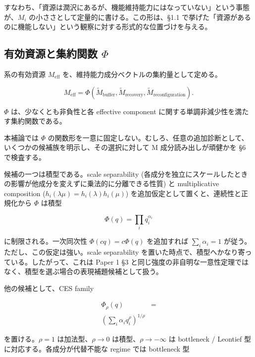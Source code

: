 \documentclass[12pt,a4paper]{article}
\begin{document}
すなわち、「資源は潤沢にあるが、機能維持能力にはなっていない」という事態が、\(M_i\) の小ささとして定量的に書ける。この形は、§1.1 で挙げた「資源があるのに機能しない」という観察に対する形式的な位置づけを与える。

\subsection{\texorpdfstring{有効資源と集約関数 \(\Phi\)}{有効資源と集約関数 \textbackslash Phi}}\label{ux6709ux52b9ux8cc7ux6e90ux3068ux96c6ux7d04ux95a2ux6570-phi}

系の有効資源 \(M_{\mathrm{eff}}\) を、維持能力成分ベクトルの集約量として定める。

\begin{definition}[有効資源]

$$
M_{\mathrm{eff}} = \Phi(\widetilde M_{\mathrm{buffer}}, \widetilde M_{\mathrm{recovery}}, \widetilde M_{\mathrm{reconfiguration}}).
$$

$\Phi$ は、少なくとも非負性と各 effective component に関する単調非減少性を満たす集約関数である。
\end{definition}

本補論では \(\Phi\) の関数形を一意に固定しない。むしろ、任意の追加診断として、いくつかの候補族を明示し、その選択に対して M 成分読み出しが頑健かを §6 で検査する。

候補の一つは積型である。scale separability (各成分を独立にスケールしたときの影響が他成分を変えずに乗法的に分離できる性質) と multiplicative composition (\(h_i(\lambda\mu) = h_i(\lambda) h_i(\mu)\)) を追加仮定として置くと、連続性と正規化から \(\Phi\) は積型

\[
\Phi(q) = \prod_{i} q_{i}^{\alpha_{i}}
\]

に制限される。一次同次性 \(\Phi(cq) = c \Phi(q)\) を追加すれば \(\sum_i \alpha_i = 1\) が従う。ただし、この仮定は強い。scale separability を置いた時点で、積型へかなり寄っている。したがって、これは Paper 1 §3 と同じ強度の非自明な一意性定理ではなく、積型を選ぶ場合の表現補題候補として扱う。

他の候補として、CES family

\[
\begin{aligned}
\Phi_\rho(q) &= \\
\left(\sum_{i} \alpha_{i} q_{i}^\rho \right)^{1/\rho}
\end{aligned}
\]

を置ける。\(\rho=1\) は加法型、\(\rho \to 0\) は積型、\(\rho \to -\infty\) は bottleneck / Leontief 型に対応する。各成分が代替不能な regime では bottleneck 型
\end{document}
